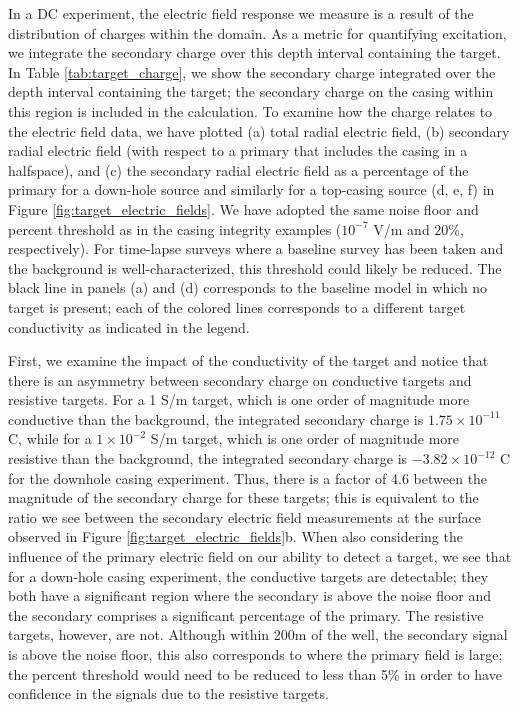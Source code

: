 




In a DC experiment, the electric field response we measure is a result of the distribution of charges within the domain. As a metric for quantifying excitation, we integrate the secondary charge over this depth interval containing the target. In Table \ref{tab:target_charge}, we show the secondary charge integrated over the depth interval containing the target; the secondary charge on the casing within this region is included in the calculation. To examine how the charge relates to the electric field data, we have plotted (a) total radial electric field, (b) secondary radial electric field (with respect to a primary that includes the casing in a halfspace), and (c) the secondary radial electric field as a percentage of the primary for a down-hole source and similarly for a top-casing source (d, e, f) in Figure \ref{fig:target_electric_fields}. We have adopted the same noise floor and percent threshold as in the casing integrity examples ($10^{-7}$ V/m and $20\%$, respectively). For time-lapse surveys where a baseline survey has been taken and the background is well-characterized, this threshold could likely be reduced. The black line in panels (a) and (d) corresponds to the baseline model in which no target is present; each of the colored lines corresponds to a different target conductivity as indicated in the legend.









First, we examine the impact of the conductivity of the target and notice that there is an asymmetry between secondary charge on conductive targets and resistive targets. For a 1 S/m target, which is one order of magnitude more conductive than the background, the integrated secondary charge is $1.75 \times 10^{-11}$ C, while for a $1\times10^{-2}$ S/m target, which is one order of magnitude more resistive than the background, the integrated secondary charge is $-3.82 \times 10^{-12}$ C for the downhole casing experiment. Thus, there is a factor of 4.6 between the magnitude of the secondary charge for these targets; this is equivalent to the ratio we see between the secondary electric field measurements at the surface observed in Figure \ref{fig:target_electric_fields}b. When also considering the influence of the primary electric field on our ability to detect a target, we see that for a down-hole casing experiment, the conductive targets are detectable; they both have a significant region where the secondary is above the noise floor and the secondary comprises a significant percentage of the primary. The resistive targets, however, are not. Although within 200m of the well, the secondary signal is above the noise floor, this also corresponds to where the primary field is large; the percent threshold would need to be reduced to less than 5\% in order to have confidence in the signals due to the resistive targets.

